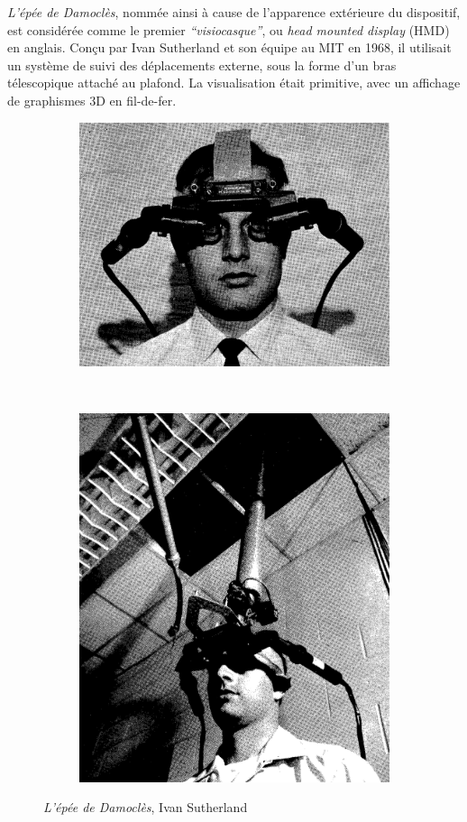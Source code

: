 \documentclass[a4,12pt]{scrartcl}
\begin{document}
\emph{L’épée de Damoclès}, nommée ainsi à cause de l’apparence extérieure du dispositif, est considérée comme le premier \emph{“visiocasque”}, ou \emph{head mounted display} (HMD) en anglais. Conçu par Ivan Sutherland et son équipe au MIT en 1968, il utilisait un système de suivi des déplacements externe, sous la forme d’un bras télescopique attaché au plafond. La visualisation était primitive, avec un affichage de graphismes 3D en fil-de-fer.

\begin{figure}[H]
	\centering
	\begin{subfigure}{.4\textwidth}
	  \centering
	  \includegraphics[width=\linewidth]{sutherland-1}
	\end{subfigure}
	~
	\begin{subfigure}{.4\textwidth}
	  \centering
	  \includegraphics[width=0.8\linewidth]{sutherland-2}
	\end{subfigure}
 	\caption{\emph{L’épée de Damoclès}, Ivan Sutherland \cite{Sutherland68}}
\end{figure}
\end{document}
